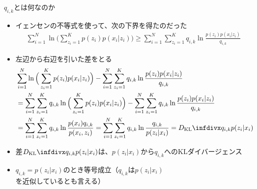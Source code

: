 \documentclass[aspectratio=169,unicode,dvipdfmx,14pt]{beamer}
\begin{document}
\begin{frame}{$q_{i,k}$とは何なのか}
\FontMath
\vspace{-.05in}
\begin{itemize}
\item イェンセンの不等式を使って、次の下界を得たのだった
\vspace{-.05in}
\begin{align}
\sum_{i=1}^N \ln \Big( \sum_{z_i=1}^K p(z_i) p(x_i | z_i) \Big)
\geq 
\sum_{i=1}^N \sum_{z_i=1}^K q_{i,k} \ln\frac{p(z_i) p(x_i | z_i)}{q_{i,k}}
\end{align}
\item 左辺から右辺を引いた差をとる
\vspace{-.05in}
\begin{align}
& \sum_{i=1}^N \ln \Big( \sum_{z_i=1}^K p(z_i) p(x_i | z_i) \Big)
- \sum_{i=1}^N \sum_{z_i=1}^K q_{i,k} \ln\frac{p(z_i) p(x_i | z_i)}{q_{i,k}}
\notag \\ &
= \sum_{i=1}^N \sum_{z_i=1}^K q_{i,k} \ln \Big( \sum_{z_i=1}^K p(z_i) p(x_i | z_i) \Big)
- \sum_{i=1}^N \sum_{z_i=1}^K q_{i,k} \ln\frac{p(z_i) p(x_i | z_i)}{q_{i,k}}
\notag \\ &
= \sum_{i=1}^N \sum_{z_i=1}^K q_{i,k} \ln \frac{p(x_i) q_{i,k}}{p(x_i , z_i)}
= \sum_{i=1}^N \sum_{z_i=1}^K q_{i,k} \ln \frac{q_{i,k}}{p(z_i | x_i)}
= \infdiv{q_{i,k}}{p(z_i | x_i)}
\end{align}
\item 差$\infdiv{q_{i,k}}{p(z_i | x_i)}$は、$p(z_i | x_i)$から$q_{i,k}$へのKLダイバージェンス
\item $q_{i,k}=p(z_i | x_i)$のとき等号成立（$q_{i,k}$は$p(z_i | x_i)$を近似しているとも言える）
\end{itemize}
\end{frame}
\end{document}
